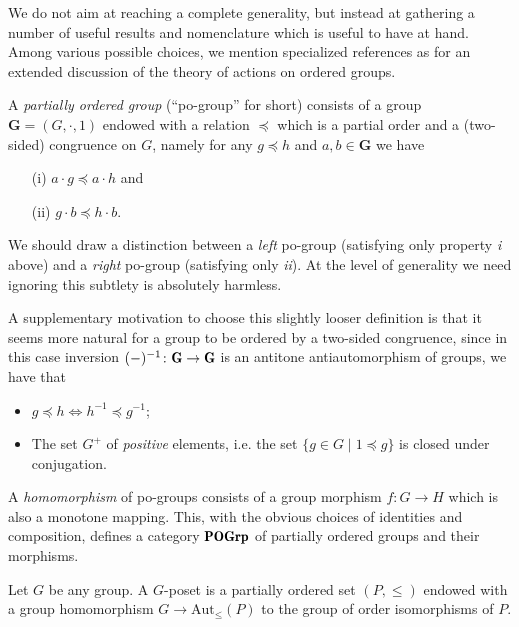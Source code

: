 \documentclass[a4paper,12pt]{amsart}
\begin{document}
We do not aim at reaching a complete generality, but instead at gathering a number of useful results and nomenclature which is useful to have at hand. Among various possible choices, we mention specialized references as \cite{blyth2005lattices, glass1999partially, Fuch63} for an extended discussion of the theory of actions on ordered groups.
\begin{definition}
A \emph{partially ordered group} (``po-group'' for short) consists of a group $\mathbf{G} = (G, \cdot,1)$ endowed with a relation $\preceq$ which is a partial order and a (two-sided) congruence on $G$, namely for any $g\preceq h$ and $a,b\in \mathbf{G}$ we have 
\begin{itemize}
\item[(i)] $a\cdot g\preceq a\cdot h$ and
\item[(ii)] $g\cdot b\preceq h\cdot b$.
\end{itemize}
\end{definition}
\begin{remark}
We should draw a distinction between a \emph{left} po-group (satisfying only property \emph{i} above) and a \emph{right} po-group (satisfying only \emph{ii}). At the level of generality we need ignoring this subtlety is absolutely harmless.

A supplementary motivation to choose this slightly looser definition is that it seems more natural for a group to be ordered by a two-sided congruence, since in this case inversion $(-)^{-1}\colon \cate{G} \to \cate{G}$ is an antitone antiautomorphism of groups, \ie we have that
\begin{itemize}
\item $g\preceq h \iff h^{-1}\preceq g^{-1}$;
\item The set $G^+$ of \emph{positive} elements, i.e. the set $\{g\in G\mid 1\preceq g\}$ is closed under conjugation.
\end{itemize}
\end{remark}
\begin{definition}
A \emph{homomorphism} of po-groups consists of a group morphism $f\colon G\to H$ which is also a monotone mapping. This, with the obvious choices of identities and composition, defines a category $\cate{POGrp}$ of partially ordered groups and their morphisms.
\end{definition}
\begin{definition}\label{def:g.poset}
Let $G$ be any group. A $G$-poset is a partially ordered set $(P, \le)$ endowed with a group homomorphism $G\to \text{Aut}_\le (P)$ to the group of order isomorphisms of $P$.
\end{definition}
\end{document}
